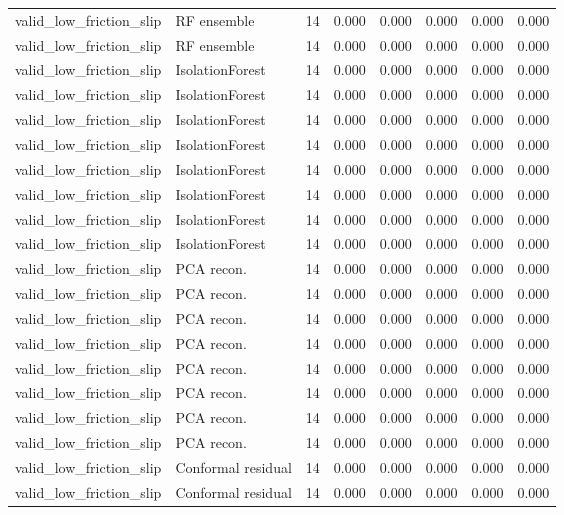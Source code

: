 {\begin{longtable}{llrrrrrr}
valid\_low\_friction\_slip & RF ensemble & 14 & 0.000 & 0.000 & 0.000 & 0.000 & 0.000 \\
valid\_low\_friction\_slip & RF ensemble & 14 & 0.000 & 0.000 & 0.000 & 0.000 & 0.000 \\
valid\_low\_friction\_slip & IsolationForest & 14 & 0.000 & 0.000 & 0.000 & 0.000 & 0.000 \\
valid\_low\_friction\_slip & IsolationForest & 14 & 0.000 & 0.000 & 0.000 & 0.000 & 0.000 \\
valid\_low\_friction\_slip & IsolationForest & 14 & 0.000 & 0.000 & 0.000 & 0.000 & 0.000 \\
valid\_low\_friction\_slip & IsolationForest & 14 & 0.000 & 0.000 & 0.000 & 0.000 & 0.000 \\
valid\_low\_friction\_slip & IsolationForest & 14 & 0.000 & 0.000 & 0.000 & 0.000 & 0.000 \\
valid\_low\_friction\_slip & IsolationForest & 14 & 0.000 & 0.000 & 0.000 & 0.000 & 0.000 \\
valid\_low\_friction\_slip & IsolationForest & 14 & 0.000 & 0.000 & 0.000 & 0.000 & 0.000 \\
valid\_low\_friction\_slip & IsolationForest & 14 & 0.000 & 0.000 & 0.000 & 0.000 & 0.000 \\
valid\_low\_friction\_slip & PCA recon. & 14 & 0.000 & 0.000 & 0.000 & 0.000 & 0.000 \\
valid\_low\_friction\_slip & PCA recon. & 14 & 0.000 & 0.000 & 0.000 & 0.000 & 0.000 \\
valid\_low\_friction\_slip & PCA recon. & 14 & 0.000 & 0.000 & 0.000 & 0.000 & 0.000 \\
valid\_low\_friction\_slip & PCA recon. & 14 & 0.000 & 0.000 & 0.000 & 0.000 & 0.000 \\
valid\_low\_friction\_slip & PCA recon. & 14 & 0.000 & 0.000 & 0.000 & 0.000 & 0.000 \\
valid\_low\_friction\_slip & PCA recon. & 14 & 0.000 & 0.000 & 0.000 & 0.000 & 0.000 \\
valid\_low\_friction\_slip & PCA recon. & 14 & 0.000 & 0.000 & 0.000 & 0.000 & 0.000 \\
valid\_low\_friction\_slip & PCA recon. & 14 & 0.000 & 0.000 & 0.000 & 0.000 & 0.000 \\
valid\_low\_friction\_slip & Conformal residual & 14 & 0.000 & 0.000 & 0.000 & 0.000 & 0.000 \\
valid\_low\_friction\_slip & Conformal residual & 14 & 0.000 & 0.000 & 0.000 & 0.000 & 0.000 \\

\end{longtable}}
